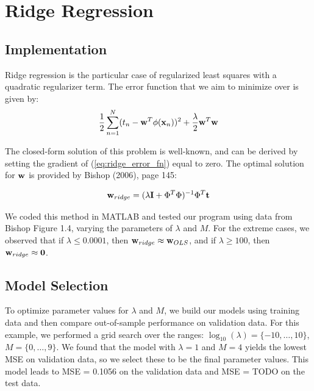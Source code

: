 
\section{Ridge Regression}\label{sec:ridge_reg}
\subsection{Implementation}
Ridge regression is the particular case of regularized least squares with a quadratic regularizer term.  The error function that we aim to minimize over is given by:
\begin{equation} \label{eq:ridge_error_fn}
\frac{1}{2} \sum_{n=1}^{N} (t_n - \boldsymbol{\mathbf{w}}^T \phi (\boldsymbol{\mathbf{x}}_n) )^2 + \frac{\lambda}{2} \boldsymbol{\mathbf{w}}^T \boldsymbol{\mathbf{w}}
\end{equation}

The closed-form solution of this problem is well-known, and can be derived by setting the gradient of (\ref{eq:ridge_error_fn}) equal to zero.  The optimal solution for $\boldsymbol{\mathbf{w}}$ is provided by Bishop (2006), page 145:

\begin{equation} \label{eq:ridge_sol}
\boldsymbol{\mathbf{w}}_{ridge} = (\lambda \boldsymbol{\mathbf{I}} + \Phi^T \Phi)^{-1} \Phi^T \boldsymbol{\mathbf{t}}
\end{equation}

We coded this method in MATLAB and tested our program using data from Bishop Figure 1.4, varying the parameters of $\lambda$ and $M$.  For the extreme cases, we observed that if $\lambda \leq 0.0001$, then $\boldsymbol{\mathbf{w}}_{ridge} \approx \boldsymbol{\mathbf{w}}_{OLS}$, and if $\lambda \geq 100$, then $\boldsymbol{\mathbf{w}}_{ridge} \approx \boldsymbol{\mathbf{0}}$.



\subsection{Model Selection}
To optimize parameter values for $\lambda$ and $M$, we build our models using training data and then compare out-of-sample performance on validation data.  For this example, we performed a grid search over the ranges: $\log_{10}(\lambda) = \{-10,\ldots,10\}$, $M = \{0,\ldots, 9\}$.  We found that the model with $\lambda = 1$ and $M = 4$ yields the lowest MSE on validation data, so we select these to be the final parameter values.  This model leads to MSE = 0.1056 on the validation data and MSE = TODO on the test data.  

